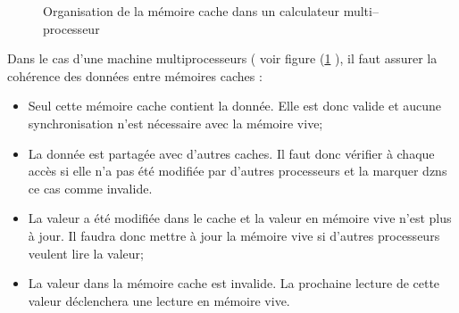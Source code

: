 \documentclass[fleqn,11pt]{article}
\begin{document}
\begin{itemize}
\begin{itemize}
\begin{figure}[h]
\begin{center}
\end{center}
\caption{Organisation de la mémoire cache dans un calculateur multi--processeur}
\label{fig:cachemultiproc}
\end{figure}

Dans le cas d'une machine multiprocesseurs ( voir figure (\ref{fig:cachemultiproc} ), il faut assurer la cohérence des données entre mémoires caches :
\begin{itemize}
\item Seul cette mémoire cache contient la donnée. Elle est donc valide et aucune synchronisation n'est nécessaire avec la mémoire vive;
\item La donnée est partagée avec d'autres caches. Il faut donc vérifier à chaque accès si elle n'a pas été modifiée par d'autres processeurs et la marquer dzns ce cas comme invalide.
\item La valeur a été modifiée dans le cache et la valeur en mémoire vive n'est plus à jour. Il faudra donc mettre à jour la mémoire vive si d'autres processeurs veulent lire la valeur;
\item La valeur dans la mémoire cache est invalide. La prochaine lecture de cette valeur déclenchera une lecture en mémoire vive. 
\end{itemize}


\end{itemize}
\end{itemize}
\end{document}
